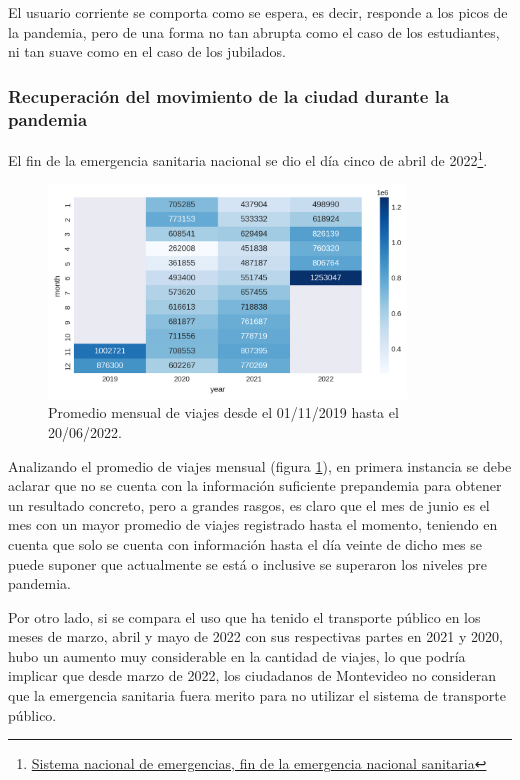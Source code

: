 \documentclass[conference]{IEEEtran}
\begin{document}
El usuario corriente se comporta como se espera, es decir, responde a los picos de la pandemia, pero de una forma no tan abrupta como el caso de los estudiantes, ni tan suave como en el caso de los jubilados.

\subsubsection{Recuperación del movimiento de la ciudad durante la pandemia}

El fin de la emergencia sanitaria nacional se dio el día cinco de abril de 2022\footnote{\href{https://www.gub.uy/sistema-nacional-emergencias/comunicacion/noticias/fin-emergencia-nacional-sanitaria}{Sistema nacional de emergencias, fin de la emergencia nacional sanitaria}}. 

\begin{figure}[htbp]
\centerline{\includegraphics[width=95mm]{Pictures/recmonth.png}}
\caption{Promedio mensual de viajes desde el 01/11/2019 hasta el 20/06/2022.}
\label{promedio mensual}
\end{figure}

Analizando el promedio de viajes mensual (figura \ref{promedio mensual}), en primera instancia se debe aclarar que no se cuenta con la información suficiente prepandemia para obtener un resultado concreto, pero a grandes rasgos, es claro que el mes de junio es el mes con un mayor promedio de viajes registrado hasta el momento, teniendo en cuenta que solo se cuenta con información hasta el día veinte de dicho mes se puede suponer que actualmente se está o inclusive se superaron los niveles pre pandemia. 

Por otro lado, si se compara el uso que ha tenido el transporte público en los meses de marzo, abril y mayo de 2022 con sus respectivas partes en 2021 y 2020, hubo un aumento muy considerable en la cantidad de viajes, lo que podría implicar que desde marzo de 2022, los ciudadanos de Montevideo no consideran que la emergencia sanitaria fuera merito para no utilizar el sistema de transporte público.
\end{document}
